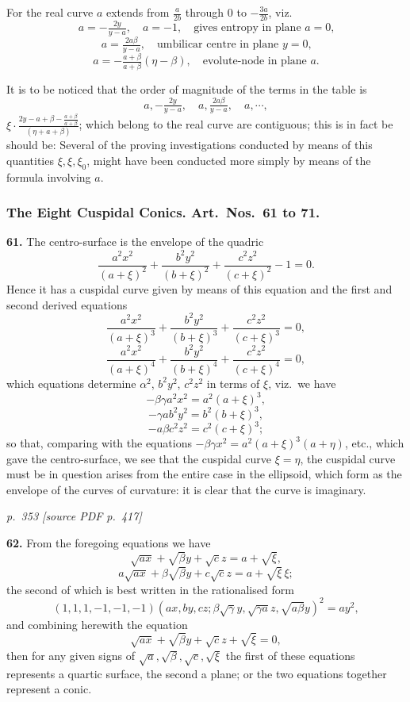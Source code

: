 \documentclass[11pt,a4paper]{article}
\newcommand{\pagemarker}[2]{\par\bigskip\noindent\textit{p.~#1 [source PDF p.~#2]}\par\smallskip}
\begin{document}
For the real curve $a$ extends from $\tfrac{a}{2b}$ through 0 to $-\tfrac{3a}{2b}$, viz.
\[
a = -\tfrac{2y}{y - a},\quad a = -1,\quad \text{gives entropy in plane $a = 0$,}
\]
\[
a = \tfrac{2a\beta}{y - a},\quad \text{umbilicar centre in plane $y = 0$,}
\]
\[
a = -\tfrac{a + \beta}{a + \beta}(\eta - \beta),\quad \text{evolute-node in plane $a$.}
\]

It is to be noticed that the order of magnitude of the terms in the table is
\[
a, -\tfrac{2y}{y - a},\quad a, \tfrac{2a\beta}{y - a},\quad a, \cdots,
\]
$\xi \cdot \tfrac{2y - a + \beta - \tfrac{a + \beta}{a + \beta}}{(\eta + a + \beta)}$; which belong to the real curve are contiguous; this is in fact be should be: Several of the proving investigations conducted by means of this quantities $\xi, \xi, \xi_0$, might have been conducted more simply by means of the formula involving $a$.

\subsubsection*{The Eight Cuspidal Conics. Art.\ Nos.\ 61 to 71.}

\textbf{61.} The centro-surface is the envelope of the quadric
\[
\frac{a^2 x^2}{(a + \xi)^2} + \frac{b^2 y^2}{(b + \xi)^2} + \frac{c^2 z^2}{(c + \xi)^2} - 1 = 0.
\]
Hence it has a cuspidal curve given by means of this equation and the first and second derived equations
\[
\frac{a^2 x^2}{(a + \xi)^3} + \frac{b^2 y^2}{(b + \xi)^3} + \frac{c^2 z^2}{(c + \xi)^3} = 0,
\]
\[
\frac{a^2 x^2}{(a + \xi)^4} + \frac{b^2 y^2}{(b + \xi)^4} + \frac{c^2 z^2}{(c + \xi)^4} = 0,
\]
which equations determine $\alpha^2$, $b^2 y^2$, $c^2 z^2$ in terms of $\xi$, viz.\ we have
\[
-\beta\gamma a^2 x^2 = a^2(a + \xi)^3,
\]
\[
-\gamma a b^2 y^2 = b^2(b + \xi)^3,
\]
\[
-a\beta c^2 z^2 = c^2(c + \xi)^3;
\]
so that, comparing with the equations $-\beta\gamma x^2 = a^2(a + \xi)^3(a + \eta)$, etc., which gave the centro-surface, we see that the cuspidal curve $\xi = \eta$, the cuspidal curve must be in question arises from the entire case in the ellipsoid, which form as the envelope of the curves of curvature: it is clear that the curve is imaginary.

\clearpage

\bigskip
\pagemarker{353}{417}
\smallskip

\textbf{62.} From the foregoing equations we have
\[
\sqrt{a x} + \sqrt{\beta}y + \sqrt{c}z = a + \sqrt{\xi},
\]
\[
a\sqrt{a x} + \beta\sqrt{\beta}y + c\sqrt{c}z = a + \sqrt{\xi}\,\xi;
\]
the second of which is best written in the rationalised form
\[
(1, 1, 1, -1, -1, -1)(a x, b y, c z; \beta\sqrt{\gamma}y, \sqrt{\gamma a}z, \sqrt{a\beta}y)^2 = a y^2,
\]
and combining herewith the equation
\[
\sqrt{a x} + \sqrt{\beta}y + \sqrt{c}z + \sqrt{\xi} = 0,
\]
then for any given signs of $\sqrt{a}, \sqrt{\beta}, \sqrt{c}, \sqrt{\xi}$ the first of these equations represents a quartic surface, the second a plane; or the two equations together represent a conic.
\end{document}
